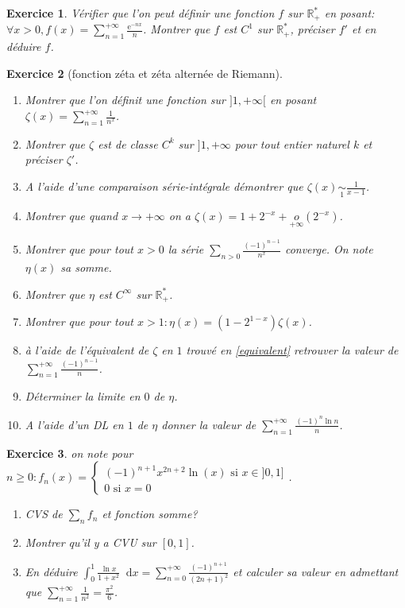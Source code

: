 \documentclass[12pt,a4paper]{article}
\newcommand{\R}{\mathbb{R}}
\newcommand{\E}{\mathrm{e}}
\newcommand{\diff}{\mathop{}\mathopen{}\mathrm{d}}%
\theoremstyle{break}
\theoremstyle{break}
\newtheorem{Exo}{Exercice}
\begin{document}
\begin{Exo}
	Vérifier que l'on peut définir une fonction $f$ sur $\R_+^*$ en posant: $\forall x> 0,f(x)=\sum_{n=1}^{+\infty}\frac{\E^{-nx}}{n}$. 
	Montrer que $f$ est $C^1$ sur $\R_+^*$, préciser $f'$ et en déduire $f$.
\end{Exo}
\newpage
\begin{Exo}[fonction zéta et zéta alternée de Riemann]\ 
	
	\begin{enumerate}
		\item
		Montrer que l'on définit une fonction sur $]1,+\infty[$ en posant $\zeta(x)=\sum_{n=1}^{+\infty}\frac{1}{n^x}$.
		\item
		Montrer que $\zeta$ est de classe $C^k$ sur $]1,+\infty$ pour tout entier naturel $k$ et préciser $\zeta'$.
		\item
		A l'aide d'une comparaison série-intégrale démontrer que $\zeta(x)\underset{1}{\sim}\frac{1}{x-1}$. \label{equivalent}
		\item Montrer que quand $x\to+\infty$ on a $\zeta(x)=1+2^{-x}+\underset{+\infty}{o}\left(2^{-x}\right)$.
		\item
		Montrer que pour tout $x>0$ la série $\sum_{n>0}\frac{(-1)^{n-1}}{n^x}$ converge. On note $\eta(x)$ sa somme.
		\item
		Montrer que $\eta$ est $C^{\infty}$ sur $\R_+^*$.
		\item Montrer que pour tout $x>1:\eta(x)=\left(1-2^{1-x}\right)\zeta(x)$.
		\item à l'aide de l'équivalent de $\zeta$ en $1$ trouvé en \ref{equivalent} retrouver la valeur de $\sum_{n=1}^{+\infty}\frac{(-1)^{n-1}}{n}$.
		\item Déterminer la limite en $0$ de $\eta$.
		\item A l'aide d'un DL en $1$ de $\eta$ donner la valeur de $\sum_{n=1}^{+\infty}\frac{(-1)^n\ln n}{n}$.
	\end{enumerate}
\end{Exo}

\begin{Exo}
	on note pour $n\geqslant 0:f_n(x)=\begin{cases}(-1)^{n+1}x^{2n+2}\ln(x)\text{ si }x\in]0,1]\\
		0\text{ si }x=0
	\end{cases}$.
	\begin{enumerate}
		\item
		CVS de $\sum_n f_n$ et fonction somme?
		\item Montrer qu'il y a CVU sur $[0,1]$.
		\item En déduire $\int_0^1\frac{\ln x}{1+x^2}\diff x=\sum_{n=0}^{+\infty}\frac{(-1)^{n+1}}{(2n+1)^2}$ et calculer sa valeur en admettant que $\sum_{n=1}^{+\infty}\frac{1}{n^2}=\frac{\pi^2}{6}$.
	\end{enumerate}
\end{Exo}
\end{document}
